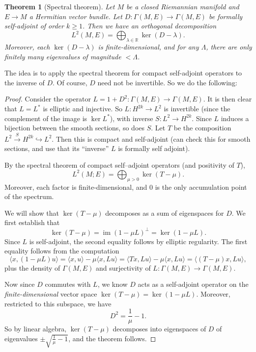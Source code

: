 \documentclass{shortart}
\newtheorem*{thm}{Theorem}
\theoremstyle{definition}
\newcommand\bra\langle
\newcommand\ket\rangle
\newcommand\R{\mathbb{R}}
\DeclareMathOperator\im{im}
\begin{document}
\begin{thm}[Spectral theorem]
  Let $M$ be a closed Riemannian manifold and $E \to M$ a Hermitian vector bundle. Let $D: \Gamma(M, E) \to \Gamma(M, E)$ be formally self-adjoint of order $k \geq 1$. Then we have an orthogonal decomposition
  \[
    L^2(M, E) = \bigoplus_{\lambda \in \R} \ker (D - \lambda).
  \]
  Moreover, each $\ker (D - \lambda)$ is finite-dimensional, and for any $\Lambda$, there are only finitely many eigenvalues of magnitude $< \Lambda$.
\end{thm}
The idea is to apply the spectral theorem for compact self-adjoint operators to the inverse of $D$. Of course, $D$ need not be invertible. So we do the following:

\begin{proof}
  Consider the operator $L = 1 + D^2: \Gamma(M, E) \to \Gamma(M, E)$. It is then clear that $L = L^*$ is elliptic and injective. So $L: H^{2k} \to L^2$ is invertible (since the complement of the image is $\ker L^*$), with inverse $S: L^2 \to H^{2k}$. Since $L$ induces a bijection between the smooth sections, so does $S$. Let $T$ be the composition $L^2 \overset{S}{\to} H^{2k} \hookrightarrow L^2$. Then this is compact and self-adjoint (can check this for smooth sections, and use that its ``inverse'' $L$ is formally self adjoint).

  By the spectral theorem of compact self--adjoint operators (and positivity of $T$),
  \[
    L^2(M; E) = \bigoplus_{\mu > 0} \ker (T - \mu).
  \]
  Moreover, each factor is finite-dimensional, and $0$ is the only accumulation point of the spectrum.

  We will show that $\ker (T - \mu)$ decomposes as a sum of eigenspaces for $D$. We first establish that
  \[
    \ker (T - \mu) = \im (1 - \mu L)^\perp = \ker (1 - \mu L).
  \]
  Since $L$ is self-adjoint, the second equality follows by elliptic regularity. The first equality follows from the computation
  \[
    \bra x, (1 - \mu L)u\ket = \bra x, u\ket - \mu \bra x, Lu\ket = \bra Tx, Lu\ket - \mu \bra x, Lu\ket = \bra (T- \mu)x, Lu\ket,
  \]
  plus the density of $\Gamma(M, E)$ and surjectivity of $L: \Gamma(M, E) \to \Gamma(M, E)$.

  Now since $D$ commutes with $L$, we know $D$ acts as a self-adjoint operator on the \emph{finite-dimensional} vector space $\ker (T - \mu) = \ker (1 - \mu L)$. Moreover, restricted to this subspace, we have
  \[
    D^2 = \frac{1}{\mu} - 1.
  \]
  So by linear algebra, $\ker (T - \mu)$ decomposes into eigenspaces of $D$ of eigenvalues $\pm \sqrt{\frac{1}{\mu} - 1}$, and the theorem follows.
\end{proof}
\end{document}
